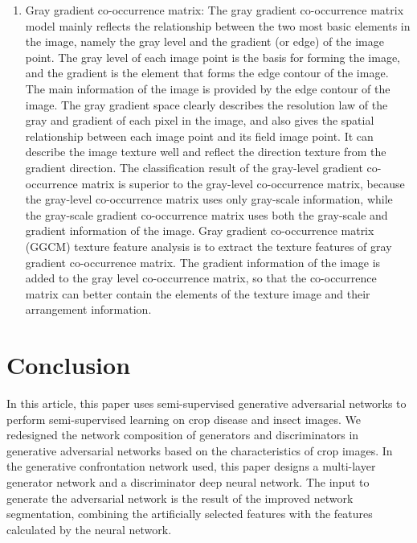 \documentclass[11pt,en]{elegantpaper}
\begin{document}
\begin{enumerate}
	\item Gray gradient co-occurrence matrix: The gray gradient co-occurrence matrix model mainly reflects the relationship between the two most basic elements in the image, namely the gray level and the gradient (or edge) of the image point. The gray level of each image point is the basis for forming the image, and the gradient is the element that forms the edge contour of the image. The main information of the image is provided by the edge contour of the image. The gray gradient space clearly describes the resolution law of the gray and gradient of each pixel in the image, and also gives the spatial relationship between each image point and its field image point. It can describe the image texture well and reflect the direction texture from the gradient direction. The classification result of the gray-level gradient co-occurrence matrix is superior to the gray-level co-occurrence matrix, because the gray-level co-occurrence matrix uses only gray-scale information, while the gray-scale gradient co-occurrence matrix uses both the gray-scale and gradient information of the image. Gray gradient co-occurrence matrix (GGCM) texture feature analysis is to extract the texture features of gray gradient co-occurrence matrix. The gradient information of the image is added to the gray level co-occurrence matrix, so that the co-occurrence matrix can better contain the elements of the texture image and their arrangement information.
\end{enumerate}

\section{Conclusion}
In this article, this paper uses semi-supervised generative adversarial networks to perform semi-supervised learning on crop disease and insect images. We redesigned the network composition of generators and discriminators in generative adversarial networks based on the characteristics of crop images. In the generative confrontation network used, this paper designs a multi-layer generator network and a discriminator deep neural network. The input to generate the adversarial network is the result of the improved network segmentation, combining the artificially selected features with the features calculated by the neural network.


\end{document}
